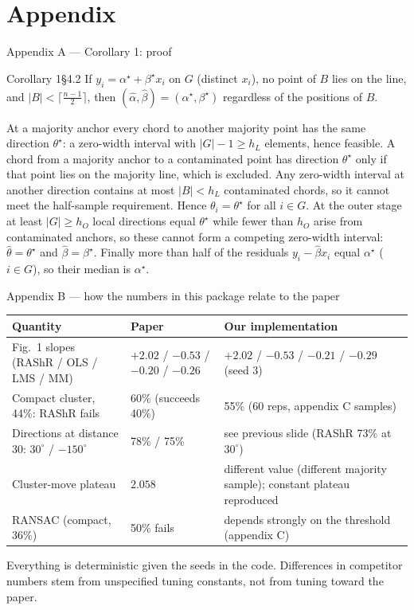 \documentclass[aspectratio=169,9pt]{beamer}
\begin{document}
\appendix
\section{Appendix}
\begin{frame}{Appendix A --- Corollary 1: proof}
\begin{rthm}{Corollary 1}{}{\S4.2}
If $y_i=\alpha^\star+\beta^\star x_i$ on $G$ (distinct $x_i$), no point of $B$ lies on the line, and $|B|<\lceil\tfrac{n-1}{2}\rceil$, then $(\hat\alpha,\hat\beta)=(\alpha^\star,\beta^\star)$ regardless of the positions of $B$.
\end{rthm}
\begin{rproof}
At a majority anchor every chord to another majority point has the same direction $\theta^\star$: a zero-width interval with $|G|-1\ge h_L$ elements, hence feasible. A chord from a majority anchor to a contaminated point has direction $\theta^\star$ only if that point lies on the majority line, which is excluded. Any zero-width interval at another direction contains at most $|B|<h_L$ contaminated chords, so it cannot meet the half-sample requirement. Hence $\theta_i=\theta^\star$ for all $i\in G$. At the outer stage at least $|G|\ge h_O$ local directions equal $\theta^\star$ while fewer than $h_O$ arise from contaminated anchors, so these cannot form a competing zero-width interval: $\hat\theta=\theta^\star$ and $\hat\beta=\beta^\star$. Finally more than half of the residuals $y_i-\hat\beta x_i$ equal $\alpha^\star$ ($i\in G$), so their median is $\alpha^\star$.
\end{rproof}
\end{frame}

\begin{frame}{Appendix B --- how the numbers in this package relate to the paper}
\small\renewcommand{\arraystretch}{1.25}
\begin{tabular}{@{}p{3.9cm}p{4.2cm}p{4.5cm}@{}}\toprule
\textbf{Quantity} & \textbf{Paper} & \textbf{Our implementation}\\\midrule
Fig.~1 slopes (RAShR / OLS / LMS / MM) & $+2.02$ / $-0.53$ / $-0.20$ / $-0.26$ & $+2.02$ / $-0.53$ / $-0.21$ / $-0.29$ (seed 3)\\
Compact cluster, 44\%: RAShR fails & 60\% (succeeds 40\%) & 55\% (60 reps, appendix C samples)\\
Directions at distance 30: $30^\circ$ / $-150^\circ$ & 78\% / 75\% & see previous slide (RAShR 73\% at $30^\circ$)\\
Cluster-move plateau & $2.058$ & different value (different majority sample); constant plateau reproduced\\
RANSAC (compact, $36\%$) & 50\% fails & depends strongly on the threshold (appendix C)\\
\bottomrule\end{tabular}\medskip

{\small Everything is deterministic given the seeds in the code. Differences in competitor numbers stem from unspecified tuning constants, not from tuning toward the paper.}
\end{frame}
\end{document}
